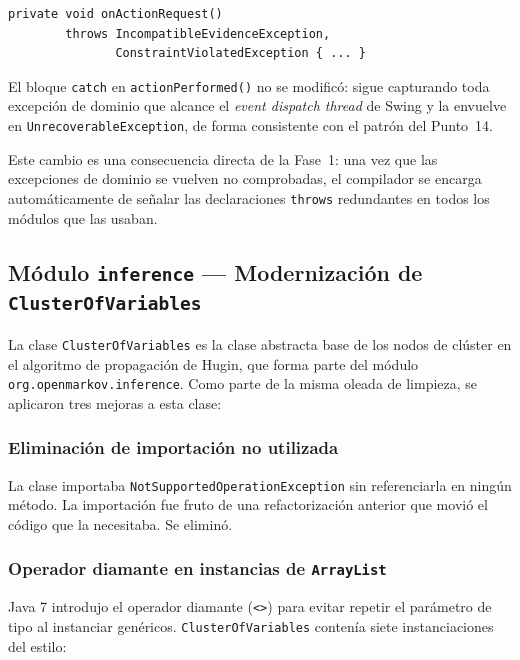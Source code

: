 \documentclass[12pt,a4paper]{article}
\begin{document}
\begin{lstlisting}[caption={Firma después en StochasticPropagationOutputFrame}]
private void onActionRequest()
        throws IncompatibleEvidenceException,
               ConstraintViolatedException { ... }
\end{lstlisting}

El bloque \texttt{catch} en \texttt{actionPerformed()} no se modificó: sigue
capturando toda excepción de dominio que alcance el \textit{event dispatch
thread} de Swing y la envuelve en \texttt{UnrecoverableException}, de forma
consistente con el patrón del Punto~14.

Este cambio es una consecuencia directa de la Fase~1: una vez que las
excepciones de dominio se vuelven no comprobadas, el compilador se encarga
automáticamente de señalar las declaraciones \texttt{throws} redundantes en
todos los módulos que las usaban.

\subsection{Módulo \texttt{inference} — Modernización de \texttt{ClusterOfVariables}}
\label{sec:inference-cleanup}

La clase \texttt{ClusterOfVariables} es la clase abstracta base de los nodos de
clúster en el algoritmo de propagación de Hugin, que forma parte del módulo
\texttt{org.openmarkov.inference}. Como parte de la misma oleada de limpieza,
se aplicaron tres mejoras a esta clase:

\subsubsection*{Eliminación de importación no utilizada}

La clase importaba \texttt{NotSupportedOperationException} sin referenciarla en
ningún método. La importación fue fruto de una refactorización anterior que
movió el código que la necesitaba. Se eliminó.

\subsubsection*{Operador diamante en instancias de \texttt{ArrayList}}

Java 7 introdujo el operador diamante (\texttt{<>}) para evitar repetir el
parámetro de tipo al instanciar genéricos. \texttt{ClusterOfVariables} contenía
siete instanciaciones del estilo:
\end{document}
